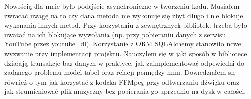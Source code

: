 \documentclass[shortabstract,inz]{iithesis}
\begin{document}
	 	Nowością dla mnie było podejście asynchroniczne w tworzeniu kodu. Musiałem zwracać uwagę na to czy dana metoda nie wykonuje się zbyt długo i nie blokuje wykonania innych metod. Przy korzystaniu z zewnętrznych bibliotek, trzeba było uważać na ich blokujące wywołania (np. przy pobieraniu danych z serwisu YouTube przez youtube\_dl). Korzystanie z ORM SQLAlchemy stanowiło nowe wyzwanie przy implementacji projektu. Nauczyłem się w jaki sposób w bibliotece działają transakcje baz danych w praktyce, jak zaimplementować odpowiedni do zadanego problemu model tabel oraz relacji pomiędzy nimi. Dowiedziałem się również o tym jak korzystać z kodeka FFMpeg przy odtwarzaniu dźwięku oraz jak strumieniować plik muzyczny bez pobierania go uprzednio na dysk w całości.
	 
	\printbibliography[title=Bibliografia]
\end{document}
